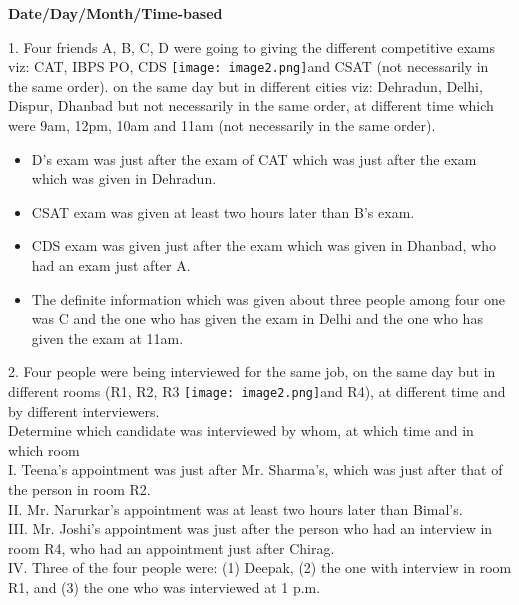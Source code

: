 \documentclass[
]{article}
\author{}
\date{}
\begin{document}
	
 

\begin{center}
	{\Large \textbf{Date/Day/Month/Time-based \\}}
\end{center}

1. Four friends A, B, C, D were going to giving the different competitive exams viz: CAT, IBPS
PO, CDS \texttt{[image: image2.png]}and CSAT (not necessarily in the same order). on the same day but in different
cities viz: Dehradun, Delhi, Dispur, Dhanbad but not necessarily in the same order, at
different time which were 9am, 12pm, 10am and 11am (not necessarily in the same order).\\
\begin{itemize}
    \item D's exam was just after the exam of CAT which was just after the exam which was given in Dehradun.
\item CSAT exam was given at least two hours later than B's exam.
\item CDS exam was given just after the exam which was given in Dhanbad, who had an
exam just after A.
\item The definite information which was given about three people among four one was C
and the one who has given the exam in Delhi and the one who has given the exam at
11am.
\end{itemize}


2. Four people were being interviewed for the same job, on the same day but in different
rooms (R1, R2, R3 \texttt{[image: image2.png]}and R4), at different time and by different interviewers.\\
Determine which candidate was interviewed by whom, at which time and in which room\\

I. Teena’s appointment was just after Mr. Sharma’s, which was just after that of the person
in room R2.\\

II. Mr. Narurkar’s appointment was at least two hours later than Bimal’s.\\

III. Mr. Joshi’s appointment was just after the person who had an interview in room R4,
who had an appointment just after Chirag.\\

IV. Three of the four people were: (1) Deepak, (2) the one with interview in room R1, and
(3) the one who was interviewed at 1 p.m.\\
\end{document}
